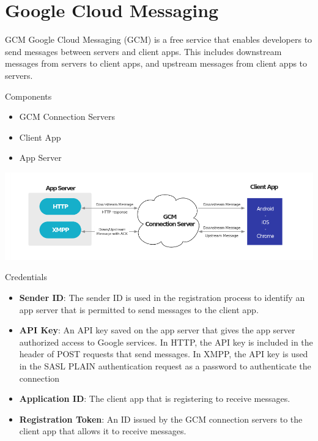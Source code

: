 \documentclass[10pt]{beamer}
\begin{document}
\section{Google Cloud Messaging}

\begin{frame}[fragile]{GCM}
      Google Cloud Messaging (GCM) is a free service that enables developers to send messages between servers and client apps. This includes downstream messages from servers to client apps, and upstream messages from client apps to servers.
\end{frame}
\begin{frame}[fragile]{Components}
      \begin{itemize}
	    \item GCM Connection Servers
	    \item Client App
	    \item App Server
  \end{itemize}
  \includegraphics[width=\textwidth]{arch.png}
\end{frame}
\begin{frame}[fragile]{Credentials}
      \begin{itemize}
	    \item \textbf{Sender ID}: The sender ID is used in the registration process to identify an app server that is permitted to send messages to the client app.
	    \item \textbf{API Key}: An API key saved on the app server that gives the app server authorized access to Google services. In HTTP, the API key is included in the header of POST requests that send messages. In XMPP, the API key is used in the SASL PLAIN authentication request as a password to authenticate the connection
	    \item \textbf{Application ID}: The client app that is registering to receive messages.
	    \item \textbf{Registration Token}: An ID issued by the GCM connection servers to the client app that allows it to receive messages.
	\end{itemize}
\end{frame}
\end{document}
